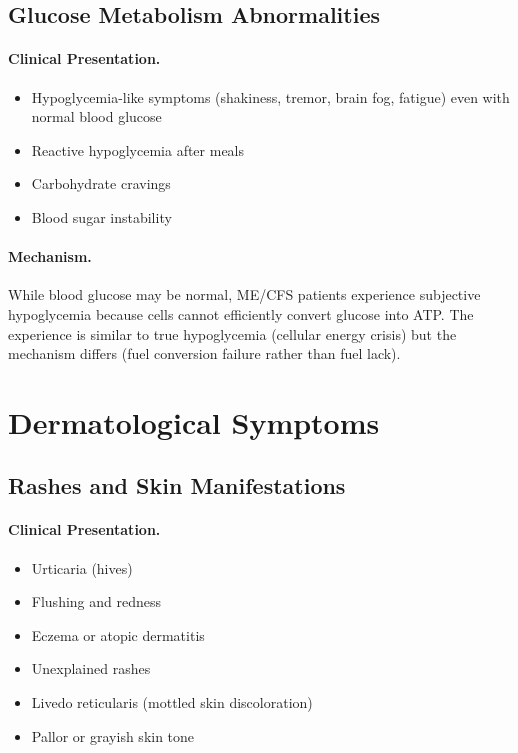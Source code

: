 \subsection{Glucose Metabolism Abnormalities}
\label{subsec:glucose}

\paragraph{Clinical Presentation.}
\begin{itemize}
    \item Hypoglycemia-like symptoms (shakiness, tremor, brain fog, fatigue) even with normal blood glucose
    \item Reactive hypoglycemia after meals
    \item Carbohydrate cravings
    \item Blood sugar instability
\end{itemize}

\paragraph{Mechanism.}
While blood glucose may be normal, ME/CFS patients experience subjective hypoglycemia because cells cannot efficiently convert glucose into ATP. The experience is similar to true hypoglycemia (cellular energy crisis) but the mechanism differs (fuel conversion failure rather than fuel lack).

\section{Dermatological Symptoms}
\label{sec:dermatological}

\subsection{Rashes and Skin Manifestations}
\label{subsec:rashes}

\paragraph{Clinical Presentation.}
\begin{itemize}
    \item Urticaria (hives)
    \item Flushing and redness
    \item Eczema or atopic dermatitis
    \item Unexplained rashes
    \item Livedo reticularis (mottled skin discoloration)
    \item Pallor or grayish skin tone
\end{itemize}

